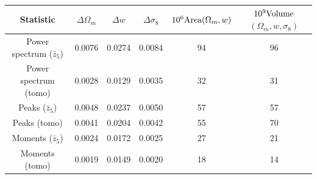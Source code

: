 \documentclass[reprint,aps,prd,superscriptaddress,showkeys,showpacs]{revtex4-1}
\begin{document}
\begin{table}
\begin{tabular}{c|c|c|c|c|c|}
\toprule
                                      \textbf{Statistic} & $\Delta \Omega_m$ & $\Delta w$ & $\Delta \sigma_8$ & $10^6{\rm Area} (\Omega_m,w)$ & $10^9{\rm Volume}$ $(\Omega_m,w,\sigma_8)$ \\ \hline \hline
\midrule
                   Power spectrum ($\bar{z}_5$) &            0.0076 &     0.0274 &            0.0084 &                            94 &                                         96 \\
                          Power spectrum (tomo) &            0.0028 &     0.0129 &            0.0035 &                            32 &                                         31 \\
                            Peaks ($\bar{z}_5$) &            0.0048 &     0.0237 &            0.0050 &                            57 &                                         57 \\
                                   Peaks (tomo) &            0.0041 &     0.0204 &            0.0042 &                            55 &                                         70 \\
                          Moments ($\bar{z}_5$) &            0.0024 &     0.0172 &            0.0025 &                            27 &                                         21 \\
                                 Moments (tomo) &            0.0019 &     0.0149 &            0.0020 &                            18 &                                         14 \\ \hline \hline


\end{tabular}
\end{table}
\end{document}
